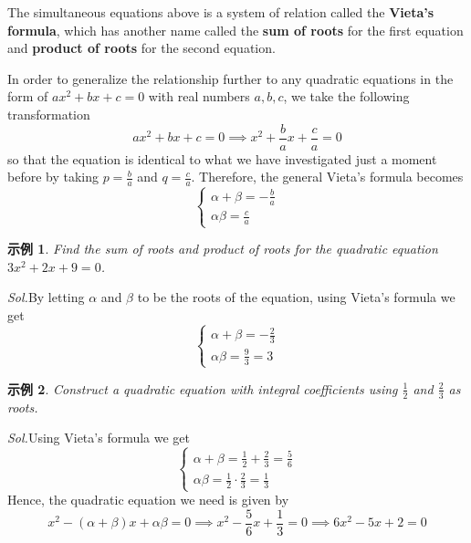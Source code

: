 \documentclass[12pt]{article}
\newtheorem{example}{示例}
\begin{document}
    The simultaneous equations above is a system of relation called the \textbf{Vieta's formula}, which has another name called the \textbf{sum of roots} for the first equation and \textbf{product of roots} for the second equation.

    In order to generalize the relationship further to any quadratic equations in the form of $ax^2+bx+c=0$ with real numbers $a,b,c$, we take the following transformation $$ax^2+bx+c=0 \implies x^2+\frac{b}{a}x+\frac{c}{a}=0$$ so that the equation is identical to what we have investigated just a moment before by taking $p=\frac{b}{a}$ and $q=\frac{c}{a}$. Therefore, the general Vieta's formula becomes $$\begin{cases}
        \alpha+\beta=-\frac{b}{a}\\ 
        \alpha\beta=\frac{c}{a}
    \end{cases}$$

    \begin{example}
        Find the sum of roots and product of roots for the quadratic equation $3x^2+2x+9=0$.
    \end{example}

    \textit{ Sol.}By letting $\alpha$ and $\beta$ to be the roots of the equation, using Vieta's formula we get $$\begin{cases}
        \alpha+\beta=-\frac{2}{3}\\ 
        \alpha\beta=\frac{9}{3}=3
    \end{cases}$$

    \begin{example}
        Construct a quadratic equation with integral coefficients using $\frac{1}{2}$ and $\frac{2}{3}$ as roots.
    \end{example}

    \textit{ Sol.}Using Vieta's formula we get $$\begin{cases}
        \alpha+\beta=\frac{1}{2}+\frac{2}{3}=\frac{5}{6}\\ 
        \alpha\beta=\frac{1}{2}\cdot \frac{2}{3}=\frac{1}{3}
    \end{cases}$$
    \indent \indent Hence, the quadratic equation we need is given by $$x^2-(\alpha+\beta)x+\alpha\beta=0 \implies x^2-\frac{5}{6}x+\frac{1}{3}=0 \implies 6x^2-5x+2=0$$
\end{document}
